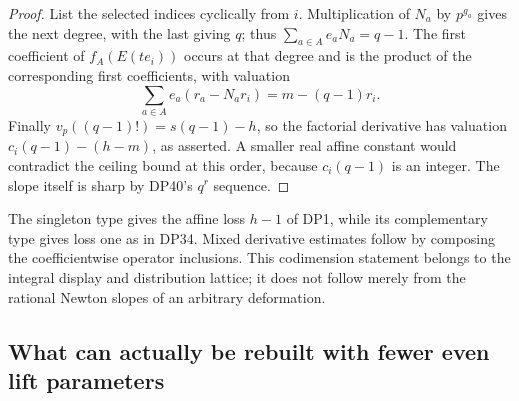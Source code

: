 \documentclass[11pt,a4paper]{article}
\theoremstyle{definition}\newtheorem{remark}[theorem]{Remark}
\newcommand{\vp}{v_p}\newcommand{\dR}{\mathrm{dR}}\newcommand{\crys}{\mathrm{crys}}
\begin{document}
\begin{proof}
List the selected indices cyclically from $i$. Multiplication of $N_a$ by $p^{g_a}$ gives the next degree, with the last giving $q$; thus
$\sum_{a\in A}e_aN_a=q-1$.
The first coefficient of $f_A(E(te_i))$ occurs at that degree and is the product of the corresponding first coefficients, with valuation
\[
 \sum_{a\in A}e_a(r_a-N_ar_i)=m-(q-1)r_i.
\]
Finally $\vp((q-1)!)=s(q-1)-h$, so the factorial derivative has valuation
$c_i(q-1)-(h-m)$, as asserted.
A smaller real affine constant would contradict the ceiling bound at this order, because $c_i(q-1)$ is an integer. The slope itself is sharp by DP40's $q^r$ sequence.
\end{proof}

The singleton type gives the affine loss $h-1$ of DP1, while its complementary type gives loss one as in DP34. Mixed derivative estimates follow by composing the coefficientwise operator inclusions. This codimension statement belongs to the integral display and distribution lattice; it does not follow merely from the rational Newton slopes of an arbitrary deformation.


\subsection{What can actually be rebuilt with fewer even lift parameters}
\end{document}

